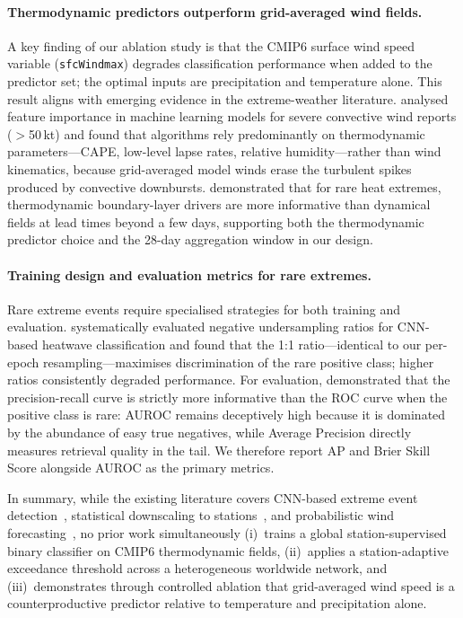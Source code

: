 \documentclass{article}
\begin{document}
\paragraph{Thermodynamic predictors outperform grid-averaged wind fields.}
A key finding of our ablation study is that the CMIP6 surface wind speed variable (\texttt{sfcWindmax}) degrades classification performance when added to the predictor set; the optimal inputs are precipitation and temperature alone. This result aligns with emerging evidence in the extreme-weather literature. \cite{flora2025thunderstorm} analysed feature importance in machine learning models for severe convective wind reports ($>$50\,kt) and found that algorithms rely predominantly on thermodynamic parameters---CAPE, low-level lapse rates, relative humidity---rather than wind kinematics, because grid-averaged model winds erase the turbulent spikes produced by convective downbursts. \cite{miloshevich2023probabilistic} demonstrated that for rare heat extremes, thermodynamic boundary-layer drivers are more informative than dynamical fields at lead times beyond a few days, supporting both the thermodynamic predictor choice and the 28-day aggregation window in our design.

\paragraph{Training design and evaluation metrics for rare extremes.}
Rare extreme events require specialised strategies for both training and evaluation. \cite{jacquesDumas2022heatwave} systematically evaluated negative undersampling ratios for CNN-based heatwave classification and found that the 1:1 ratio---identical to our per-epoch resampling---maximises discrimination of the rare positive class; higher ratios consistently degraded performance. For evaluation, \cite{saito2015precision} demonstrated that the precision-recall curve is strictly more informative than the ROC curve when the positive class is rare: AUROC remains deceptively high because it is dominated by the abundance of easy true negatives, while Average Precision directly measures retrieval quality in the tail. We therefore report AP and Brier Skill Score alongside AUROC as the primary metrics.

In summary, while the existing literature covers CNN-based extreme event detection~\cite{racahExtremeWeather2017,molinaBenchmark2021}, statistical downscaling to stations~\cite{banomedinaDeepESD2022,busterSRDRN2024}, and probabilistic wind forecasting~\cite{schulzLerchWindGusts2022}, no prior work simultaneously (i)~trains a global station-supervised binary classifier on CMIP6 thermodynamic fields, (ii)~applies a station-adaptive exceedance threshold across a heterogeneous worldwide network, and (iii)~demonstrates through controlled ablation that grid-averaged wind speed is a counterproductive predictor relative to temperature and precipitation alone.
\end{document}
